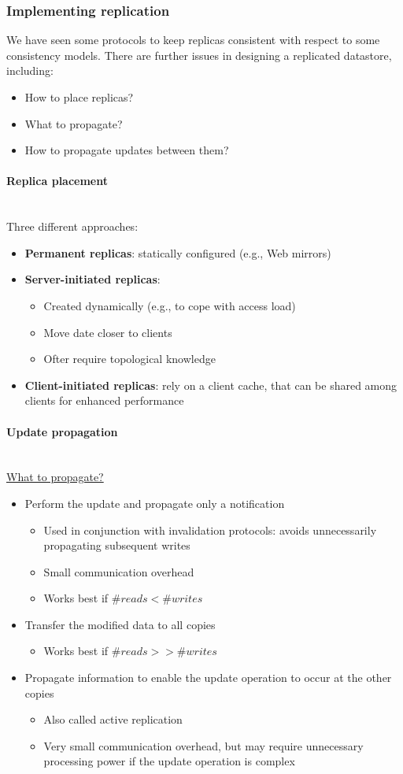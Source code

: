 \documentclass[10pt,a4paper]{article}
\newcommand{\myparagraph}[1]{\paragraph{#1}\mbox{}\\[0.05in]}
\begin{document}
\subsubsection{Implementing replication}
We have seen some protocols to keep replicas consistent with respect to some consistency models. There are further issues in designing a replicated datastore, including:
\begin{itemize}
	\item How to place replicas?
	\item What to propagate?
	\item How to propagate updates between them?
\end{itemize}
\myparagraph{Replica placement}
Three different approaches:
\begin{itemize}
	\item \textbf{Permanent replicas}: statically configured (e.g., Web mirrors)
	\item \textbf{Server-initiated replicas}: 
	\begin{itemize}
	 \item Created dynamically (e.g., to cope with access load)
	 \item Move date closer to clients
	 \item Ofter require topological knowledge
	\end{itemize}
	\item \textbf{Client-initiated replicas}: rely on a client cache, that can be shared among clients for enhanced performance
\end{itemize}
\myparagraph{Update propagation}
\underline{What to propagate?}
\begin{itemize}
	\item Perform the update and propagate only a notification
	\begin{itemize}
		\item Used in conjunction with invalidation protocols: avoids unnecessarily propagating subsequent writes
		\item Small communication overhead
		\item Works best if $\#reads < \#writes$
	\end{itemize}
	\item Transfer the modified data to all copies
	\begin{itemize}
		\item Works best if $\#reads >> \#writes$
	\end{itemize}
	\item Propagate information to enable the update operation to occur at the other copies
	\begin{itemize}
		\item Also called active replication
		\item Very small communication overhead, but may require unnecessary processing power if the update operation is complex
	\end{itemize}
\end{itemize}
\end{document}
